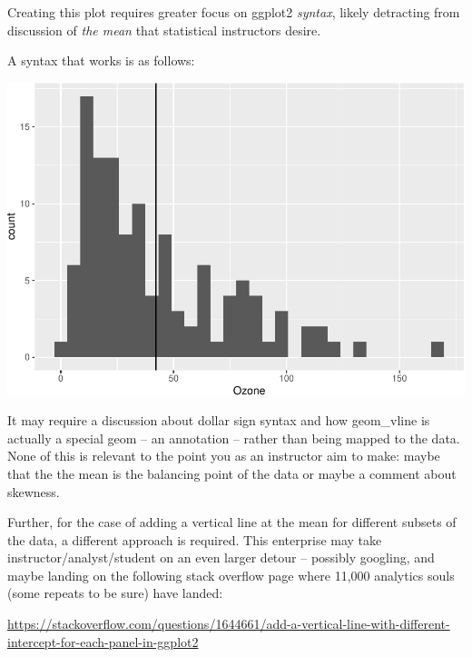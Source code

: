 \documentclass[12pt]{article}
\newenvironment{Shaded}{\begin{snugshade}}{\end{snugshade}}
\newcommand{\AttributeTok}[1]{\textcolor[rgb]{0.77,0.63,0.00}{#1}}
\newcommand{\FunctionTok}[1]{\textcolor[rgb]{0.00,0.00,0.00}{#1}}
\newcommand{\NormalTok}[1]{#1}
\newcommand{\SpecialCharTok}[1]{\textcolor[rgb]{0.00,0.00,0.00}{#1}}
\begin{document}
Creating this plot requires greater focus on ggplot2 \emph{syntax},
likely detracting from discussion of \emph{the mean} that statistical
instructors desire.

A syntax that works is as follows:

\begin{Shaded}
\end{Shaded}

\begin{center}\includegraphics[width=0.5\linewidth]{manuscript_files/figure-latex/unnamed-chunk-3-1} \end{center}

It may require a discussion about dollar sign syntax and how geom\_vline
is actually a special geom -- an annotation -- rather than being mapped
to the data. None of this is relevant to the point you as an instructor
aim to make: maybe that the the mean is the balancing point of the data
or maybe a comment about skewness.

Further, for the case of adding a vertical line at the mean for
different subsets of the data, a different approach is required. This
enterprise may take instructor/analyst/student on an even larger detour
-- possibly googling, and maybe landing on the following stack overflow
page where 11,000 analytics souls (some repeats to be sure) have landed:

\url{https://stackoverflow.com/questions/1644661/add-a-vertical-line-with-different-intercept-for-each-panel-in-ggplot2}
\end{document}
